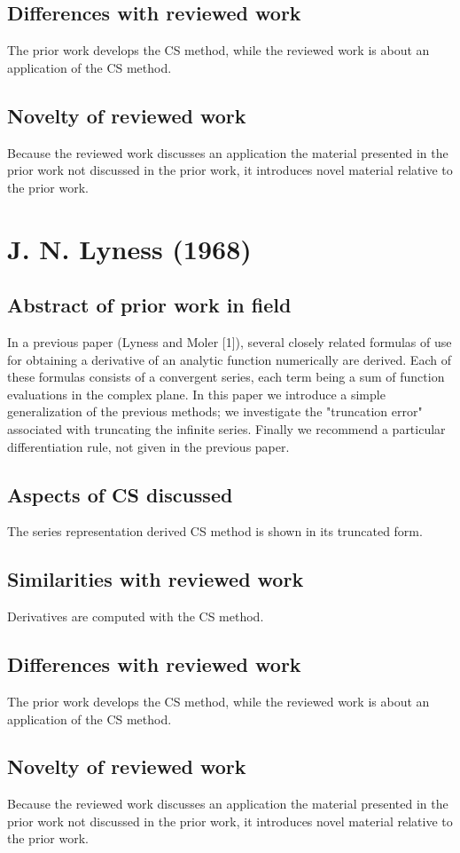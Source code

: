 \documentclass[10pt,letterpaper,draft]{article}
\begin{document}
\subsection{Differences with reviewed work}
The prior work develops the CS method, while the reviewed work
is about an application of the CS method.

\subsection{Novelty of reviewed work}
Because the reviewed work discusses an application the material presented in the
prior work not discussed in the prior work, it introduces novel material relative to the
prior work.

\section{J. N. Lyness (1968)}
\subsection{Abstract of prior work in field}

In a previous paper (Lyness and Moler [1]), several closely related formulas of
use for obtaining a derivative of an analytic function numerically are derived.
Each of these formulas consists of a convergent series, each term being a sum
of function evaluations in the complex plane.  In this paper we introduce a
simple generalization of the previous methods; we investigate the "truncation
error" associated with truncating the infinite series.  Finally we recommend a
particular differentiation rule, not given in the previous paper.

\subsection{Aspects of CS discussed}
The series representation derived CS method is shown in its truncated form.

\subsection{Similarities with reviewed work}
Derivatives are computed with the CS method.

\subsection{Differences with reviewed work}
The prior work develops the CS method, while the reviewed work
is about an application of the CS method.

\subsection{Novelty of reviewed work}
Because the reviewed work discusses an application the material presented in the
prior work not discussed in the prior work, it introduces novel material relative to the
prior work.
\end{document}
